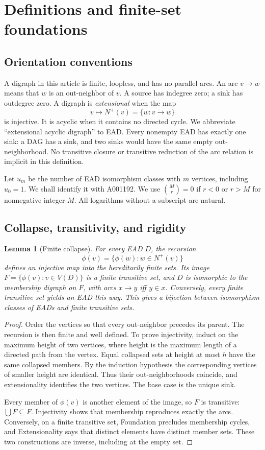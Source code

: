 \documentclass[11pt,a4paper]{article}
\newtheorem{lemma}[theorem]{Lemma}
\theoremstyle{definition}
\begin{document}
\section{Definitions and finite-set foundations}

\subsection{Orientation conventions}
A digraph in this article is finite, loopless, and has no parallel arcs.
An arc $v\to w$ means that $w$ is an out-neighbor of $v$.
A source has indegree zero; a sink has outdegree zero.
A digraph is \emph{extensional} when the map
\[
 v\longmapsto N^+(v)=\{w:v\to w\}
\]
is injective. It is acyclic when it contains no directed cycle.
We abbreviate ``extensional acyclic digraph'' to EAD.
Every nonempty EAD has exactly one sink: a DAG has a sink, and two sinks
would have the same empty out-neighborhood. No transitive closure or
transitive reduction of the arc relation is implicit in this definition.

Let $u_m$ be the number of EAD isomorphism classes with $m$ vertices,
including $u_0=1$. We shall identify it with A001192. We use
$\binom{M}{r}=0$ if $r<0$ or $r>M$ for nonnegative integer $M$.
All logarithms without a subscript are natural.

\subsection{Collapse, transitivity, and rigidity}
\begin{lemma}[Finite collapse]\label{sbd:lem:collapse}
For every EAD $D$, the recursion
\[
 \phi(v)=\{\phi(w):w\in N^+(v)\}
\]
defines an injective map into the hereditarily finite sets. Its image
$F=\{\phi(v):v\in V(D)\}$ is a finite transitive set, and $D$ is
isomorphic to the membership digraph on $F$, with arcs $x\to y$ iff
$y\in x$. Conversely, every finite transitive set yields an EAD this way.
This gives a bijection between isomorphism classes of EADs and finite
transitive sets.
\end{lemma}
\begin{proof}
Order the vertices so that every out-neighbor precedes its parent.
The recursion is then finite and well defined. To prove injectivity,
induct on the maximum height of two vertices, where height is the
maximum length of a directed path from the vertex. Equal collapsed sets
at height at most $h$ have the same collapsed members. By the induction
hypothesis the corresponding vertices of smaller height are identical.
Thus their out-neighborhoods coincide, and extensionality identifies
the two vertices. The base case is the unique sink.

Every member of $\phi(v)$ is another element of the image, so $F$ is
transitive: $\bigcup F\subseteq F$. Injectivity shows that membership
reproduces exactly the arcs. Conversely, on a finite transitive set,
Foundation precludes membership cycles, and Extensionality says that
distinct elements have distinct member sets. These two constructions
are inverse, including at the empty set.
\end{proof}
\end{document}
